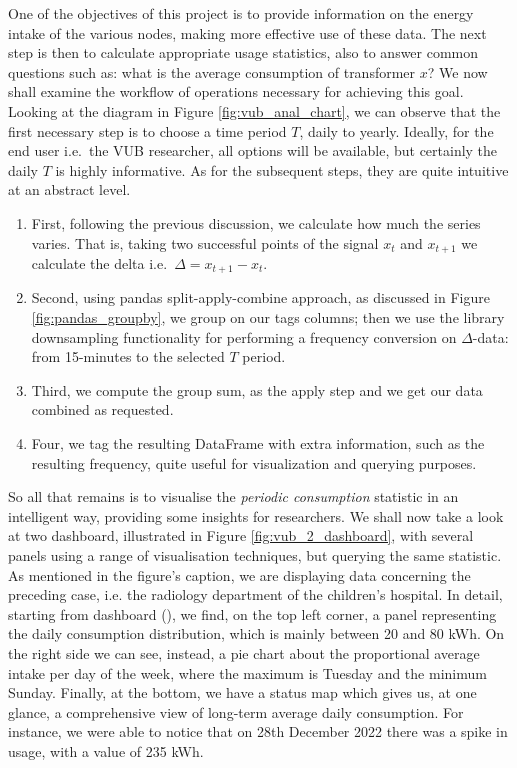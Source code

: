 One of the objectives of this project is to provide information on the energy intake of the various nodes, making more effective use of these data. 
The next step is then to calculate appropriate usage statistics, also to answer common questions such as: what is the average consumption of transformer $x$?
We now shall examine the workflow of operations necessary for achieving this goal.
Looking at the diagram in Figure \ref{fig:vub_anal_chart}, we can observe that the first necessary step is to choose a time period $T$, daily to yearly.
Ideally, for the end user i.e.\ the VUB researcher, all options will be available, but certainly the daily $T$ is highly informative.
As for the subsequent steps, they are quite intuitive at an abstract level.
\begin{enumerate}
    \item First, following the previous discussion, we calculate how much the series varies. 
    That is, taking two successful points of the signal $x_t$ and $x_{t+1}$ we calculate the delta i.e.\ $\Delta = x_{t+1} - x_t$.
    \item Second, using pandas split-apply-combine approach, as discussed in Figure \ref{fig:pandas_groupby}, we group on our tags columns; then we use the library downsampling 
    functionality for performing a frequency conversion on $\Delta$-data: from 15-minutes to the selected $T$ period.
    \item Third, we compute the group sum, as the apply step and we get our data combined as requested.
    \item Four, we tag the resulting DataFrame with extra information, such as the resulting frequency, quite useful for visualization and querying purposes.
\end{enumerate}

So all that remains is to visualise the \textit{periodic consumption} statistic in an intelligent way, providing some insights for researchers.
We shall now take a look at two dashboard, illustrated in Figure \ref{fig:vub_2_dashboard}, with several panels using a range of visualisation techniques, but querying the same statistic.
As mentioned in the figure's caption, we are displaying data concerning the preceding case, i.e. the radiology department of the children's hospital.
In detail, starting from dashboard (), we find, on the top left corner, a panel representing the daily consumption distribution, which is mainly between 20 and 80 kWh. 
On the right side we can see, instead, a pie chart about the proportional average intake per day of the week, where the maximum is Tuesday and the minimum Sunday. 
Finally, at the bottom, we have a status map which gives us, at one glance, a comprehensive view of long-term average daily consumption. 
For instance, we were able to notice that on 28th December 2022 there was a spike in usage, with a value of 235 kWh.

